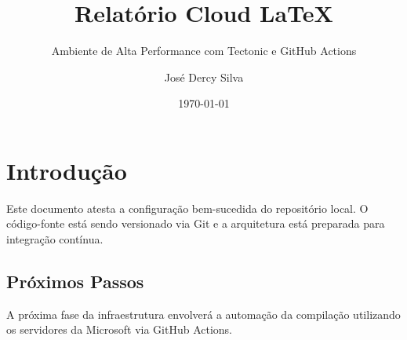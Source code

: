\documentclass[
    paper=a4,
    fontsize=11pt,
    twoside=false
]{scrreprt}
\begin{document}
\title{Relatório Cloud LaTeX}
\subtitle{Ambiente de Alta Performance com Tectonic e GitHub Actions}
\author{José Dercy Silva}
\date{\today}
\maketitle

\chapter{Introdução}
Este documento atesta a configuração bem-sucedida do repositório local. O código-fonte está sendo versionado via Git e a arquitetura está preparada para integração contínua.

\section{Próximos Passos}
A próxima fase da infraestrutura envolverá a automação da compilação utilizando os servidores da Microsoft via GitHub Actions.
\end{document}
